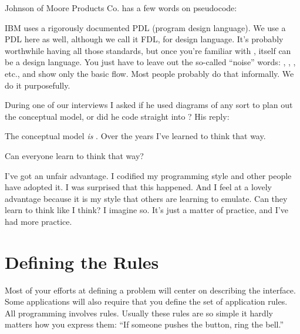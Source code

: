 \begin{interview}
Johnson of Moore Products Co. has a few words on \Forth{} pseudocode:

\begin{tfquot}
IBM uses a rigorously documented PDL (program design language). We use
a PDL here as well, although we call it FDL, for \Forth{} design
language. It's probably worthwhile having all those standards, but
once you're familiar with \Forth{}, \Forth{} itself can be a design
language. You just have to leave out the so-called ``noise'' words:
, , , etc., and show only the basic
flow. Most \Forth{} people probably do that informally. We do it
purposefully.
\end{tfquot}
During one of our interviews I asked  if he used diagrams of any sort to plan out the conceptual
model, or did he code straight into \Forth{}? His reply:

\begin{tfquot}
The conceptual model \emph{is} \Forth{}. Over the years I've learned
to think that way.
\end{tfquot}
Can everyone learn to think that way?

\begin{tfquot}
I've got an unfair advantage. I codified my programming style and other
people have adopted it. I was surprised that this happened. And I feel at a
lovely advantage because it is my style that others are learning to emulate.
Can they learn to think like I think? I imagine so. It's just a matter of
practice, and I've had more practice.
\end{tfquot}
\end{interview}

\section{Defining the Rules}

Most of your efforts at defining a problem will center on describing
the interface.
Some applications will also require that you define the set of
application rules.  All programming involves rules. Usually these
rules are so simple it hardly matters how you express them: ``If
someone pushes the button, ring the bell.''

